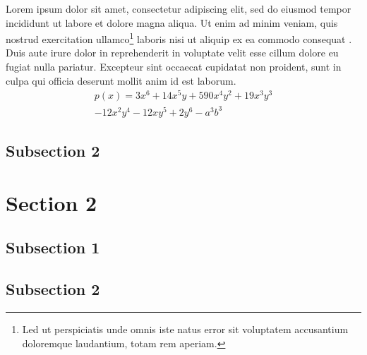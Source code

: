 \par
Lorem ipsum dolor sit amet, consectetur adipiscing elit, sed do eiusmod tempor incididunt ut labore et dolore magna aliqua. Ut enim ad minim veniam, quis nostrud exercitation ullamco\footnote{\label{foot_note_1}Led ut perspiciatis unde omnis iste natus error sit voluptatem accusantium doloremque laudantium, totam rem aperiam.} laboris nisi ut aliquip ex ea commodo consequat \cite{bruno}. Duis aute irure dolor in reprehenderit in voluptate velit esse cillum dolore eu fugiat nulla pariatur. Excepteur sint occaecat cupidatat non proident, sunt in culpa qui officia deserunt mollit anim id est laborum. \cite{smith}
\begin{multline}
p(x) = 3x^6 + 14x^5y + 590x^4y^2 + 19x^3y^3\\
- 12x^2y^4 - 12xy^5 + 2y^6 - a^3b^3
\end{multline}


\subsection{Subsection 2} %
\label{sub:subsection_212}

\lipsum[5-5]

\par
\lipsum[6-6]

\section{Section 2} %
\label{sec:section_22}
\lipsum[1-1]

\par
\lipsum[2-2]

\subsection{Subsection 1} %
\label{sub:subsection_221}

\lipsum[3-3]

\par
\lipsum[4-4]

\subsection{Subsection 2} %
\label{sub:subsection_222}

\lipsum[5-5]

\par
\lipsum[6-6]
